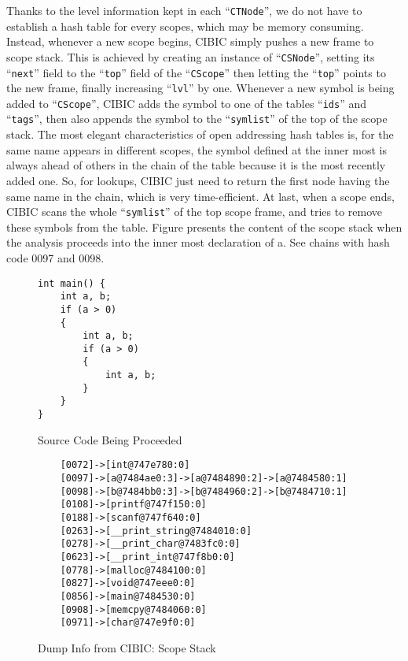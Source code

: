 \documentclass[10pt, a4paper]{article}
\begin{document}
Thanks to the level information kept in each ``\texttt{CTNode}'', we do not
have to establish a hash table for every scopes, which may be memory consuming.
Instead, whenever a new scope begins, CIBIC simply pushes a new frame to scope
stack. This is achieved by creating an instance of ``\texttt{CSNode}'', setting
its ``\texttt{next}'' field to the ``\texttt{top}'' field of the
``\texttt{CScope}'' then letting the ``\texttt{top}'' points to the new frame,
finally increasing ``\texttt{lvl}'' by one. Whenever a new symbol is being
added to ``\texttt{CScope}'', CIBIC adds the symbol to one of the tables
``\texttt{ids}'' and ``\texttt{tags}'', then also appends the symbol to the
``\texttt{symlist}'' of the top of the scope stack. The most elegant
characteristics of open addressing hash tables is, for the same name appears in
different scopes, the symbol defined at the inner most is always ahead of
others in the chain of the table because it is the most recently added one. So,
for lookups, CIBIC just need to return the first node having the same name in
the chain, which is very time-efficient. At last, when a scope ends, CIBIC
scans the whole ``\texttt{symlist}'' of the top scope frame, and tries to
remove these symbols from the table. Figure presents the content of the scope
stack when the analysis proceeds into the inner most declaration of a. See
chains with hash code 0097 and 0098.
\begin{figure}[H]
    \begin{minipage}{0.35\textwidth}
    \begin{verbatim}
int main() {
    int a, b;
    if (a > 0)
    {
        int a, b;
        if (a > 0)
        {
            int a, b;
        }
    }
}
    \end{verbatim}
 \caption {Source Code Being Proceeded}
\end{minipage}
    \begin{minipage}{0.5\textwidth}
    \begin{BVerbatim}
    [0072]->[int@747e780:0]
    [0097]->[a@7484ae0:3]->[a@7484890:2]->[a@7484580:1]
    [0098]->[b@7484bb0:3]->[b@7484960:2]->[b@7484710:1]
    [0108]->[printf@747f150:0]
    [0188]->[scanf@747f640:0]
    [0263]->[__print_string@7484010:0]
    [0278]->[__print_char@7483fc0:0]
    [0623]->[__print_int@747f8b0:0]
    [0778]->[malloc@7484100:0]
    [0827]->[void@747eee0:0]
    [0856]->[main@7484530:0]
    [0908]->[memcpy@7484060:0]
    [0971]->[char@747e9f0:0]
    \end{BVerbatim}
    \caption {Dump Info from CIBIC: Scope Stack}
\end{minipage}
\end{figure}
\end{document}
